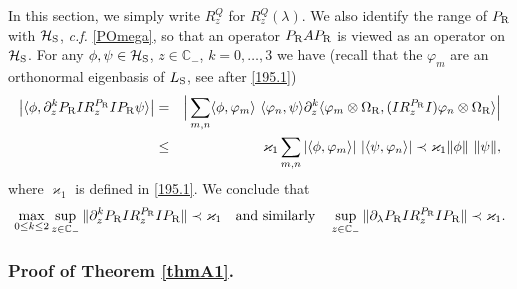 \documentclass[letterpaper,onecolumn,11pt,accepted=2021-12-09]{quantumarticle}
\numberwithin{equation}{section}
\renewcommand{\r}{{\rm R}}
\newcommand{\s}{{\rm S}}
\begin{document}
In this section, we simply write $R_z^Q$ for $R_z^Q(\lambda)$. We also identify the range of $P_\r$ with ${\mathcal H}_\s$, {\em c.f.} \eqref{POmega}, so that an operator $P_\r A P_\r$ is viewed as an operator on ${\mathcal H}_\s$. For any $\phi,\psi\in{\mathcal H}_\s$, $z\in{\mathbb C}_-$,  $k=0,\ldots,3$ we have (recall that the $\varphi_m$ are an orthonormal eigenbasis of $L_\s$, see after \eqref{195.1})
\begin{eqnarray}
\big| \langle\phi, \partial^k_z P_\r IR_z^{P_\r}IP_\r\psi\rangle\big| &=&\Big| \sum_{m,n} \langle \phi,\varphi_m\rangle \ \langle \varphi_n,\psi \rangle  \partial^k_z  \langle\varphi_m\otimes\Omega_\r,  (IR_z^{P_\r}I)\varphi_n\otimes\Omega_\r\rangle
\Big| \nonumber \\
&\le& \varkappa_1\sum_{m,n} |\langle \phi,\varphi_m\rangle| \ |\langle \psi,\varphi_n\rangle|  \prec \varkappa_1 \|\phi\|\ \|\psi\|,
\label{162}
\end{eqnarray}
where $\varkappa_1$ is defined in \eqref{195.1}.  We conclude that 
\begin{equation}
	\max_{0\le k\le 2}	\sup_{z\in{\mathbb C}_-}\| \partial_z^k P_\r I R_z^{P_\r} I P_\r\|\prec \varkappa_1 \quad \mbox{and similarly}\quad \sup_{z\in{\mathbb C}_-}\| \partial_\lambda P_\r I R_z^{P_\r} I P_\r\|\prec\varkappa_1.
	\label{90}
\end{equation}



\subsubsection{Proof of Theorem \ref{thmA1}.} 
\label{proofthmA1section}
\end{document}
